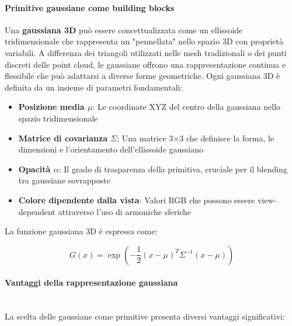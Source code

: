 \paragraph{Primitive gaussiane come building blocks
}
Una \textbf{gaussiana 3D} può essere concettualizzata come un ellissoide tridimensionale che rappresenta un "pennellata" nello spazio 3D con proprietà variabili. A differenza dei triangoli utilizzati nelle mesh tradizionali o dei punti discreti delle point cloud, le gaussiane offrono una rappresentazione continua e flessibile che può adattarsi a diverse forme geometriche.
\newline
\newline
Ogni gaussiana 3D è definita da un insieme di parametri fondamentali:
\begin{itemize}
\item \textbf{Posizione media $\mu$}: Le coordinate XYZ del centro della gaussiana nello spazio tridimensionale
\item \textbf{Matrice di covarianza $\Sigma$}: Una matrice 3×3 che definisce la forma, le dimensioni e l'orientamento dell'ellissoide gaussiano
\item \textbf{Opacità $\alpha$}: Il grado di trasparenza della primitiva, cruciale per il blending tra gaussiane sovrapposte
\item \textbf{Colore dipendente dalla vista}: Valori RGB che possono essere view-dependent attraverso l'uso di armoniche sferiche
\end{itemize}

\newpage
La funzione gaussiana 3D è espressa come:

\begin{equation}
G(x) = \exp\left(-\frac{1}{2}(x-\mu)^T\Sigma^{-1}(x-\mu)\right)
\end{equation}

\paragraph{Vantaggi della rappresentazione gaussiana}\mbox{}\\
La scelta delle gaussiane come primitive presenta diversi vantaggi significativi:

